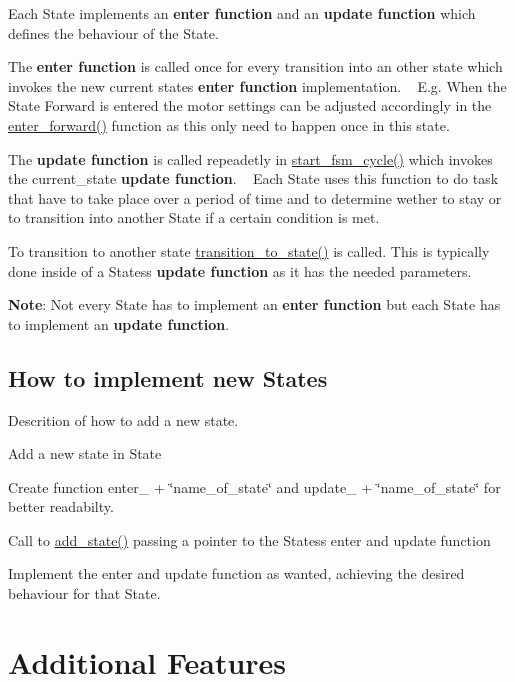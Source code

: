 \begin{DoxyItemize}
\item Each State implements an {\bfseries enter function} and an {\bfseries update function} which defines the behaviour of the State. ~\newline

\item The {\bfseries enter function} is called once for every transition into an other state which invokes the new current state\textquotesingle{}s {\bfseries enter function} implementation. ~\newline
 E.\+g. When the State Forward is entered the motor settings can be adjusted accordingly in the \hyperlink{states_8c_a639a5239b6bf87b7629b5a5a781f0623}{enter\+\_\+forward()} function as this only need to happen once in this state.
\item The {\bfseries update function} is called repeadetly in \hyperlink{fsm_8c_a053b1146a3f1c34576d89d599e34329a}{start\+\_\+fsm\+\_\+cycle()} which invokes the current\+\_\+state {\bfseries update function}. ~\newline
 Each State uses this function to do task that have to take place over a period of time and to determine wether to stay or to transition into another State if a certain condition is met.
\item To transition to another state \hyperlink{fsm_8c_a80016823d020a335a595bcd09bc39c96}{transition\+\_\+to\+\_\+state()} is called. This is typically done inside of a States\textquotesingle{}s {\bfseries update function} as it has the needed parameters.
\item {\bfseries Note}\+: Not every State has to implement an {\bfseries enter function} but each State has to implement an {\bfseries update function}.
\end{DoxyItemize}\hypertarget{index_implement_new_states}{}\subsection{How to implement new States}\label{index_implement_new_states}
Descrition of how to add a new state.
\begin{DoxyItemize}
\item Add a new state in State
\item Create function enter\+\_\+ + \char`\"{}name\+\_\+of\+\_\+state\char`\"{} and update\+\_\+ + \char`\"{}name\+\_\+of\+\_\+state\char`\"{} for better readabilty.
\item Call to \hyperlink{fsm_8c_a2d99213b7ce90d5e4b0cbd7f261d8e3e}{add\+\_\+state()} passing a pointer to the States\textquotesingle{}s enter and update function
\item Implement the enter and update function as wanted, achieving the desired behaviour for that State.
\end{DoxyItemize}\hypertarget{index_additional_features}{}\section{Additional Features}\label{index_additional_features}
